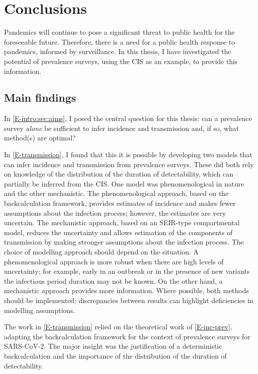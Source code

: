\documentclass[thesis.tex]{subfiles}
\begin{document}
\ifSubfilesClassLoaded{
    \setcounter{chapter}{7}
}

\chapter{Conclusions} \label{conclusion}

Pandemics will continue to pose a significant threat to public health for the foreseeable future.
Therefore, there is a need for a public health response to pandemics, informed by surveillance.
In this thesis, I have investigated the potential of prevalence surveys, using the CIS as an example, to provide this information.

\section{Main findings}

In \cref{E-intro:sec:aims}, I posed the central question for this thesis: can a prevalence survey \emph{alone} be sufficient to infer incidence and transmission and, if so, what method(s) are optimal?

In \cref{E-transmission}, I found that this it is possible by developing two models that can infer incidence and transmission from prevalence surveys.
These did both rely on knowledge of the distribution of the duration of detectability, which can partially be inferred from the CIS.
One model was phenomenological in nature and the other mechanistic.
The phenomenological approach, based on the backcalculation framework, provides estimates of incidence and makes fewer assumptions about the infection process; however, the estimates are very uncertain.
The mechanistic approach, based on an SEIR-type compartmental model, reduces the uncertainty and allows estimation of the components of transmission by making stronger assumptions about the infection process.
The choice of modelling approach should depend on the situation.
A phenomenological approach is more robust when there are high levels of uncertainty; for example, early in an outbreak or in the presence of new variants the infectious period duration may not be known.
On the other hand, a mechanistic approach provides more information.
Where possible, both methods should be implemented; discrepancies between results can highlight deficiencies in modelling assumptions.

The work in \cref{E-transmission} relied on the theoretical work of \cref{E-inc-prev}, adapting the backcalculation framework for the context of prevalence surveys for SARS-CoV-2.
The major insight was the justification of a deterministic backcalculation and the importance of the distribution of the duration of detectability.
\end{document}
